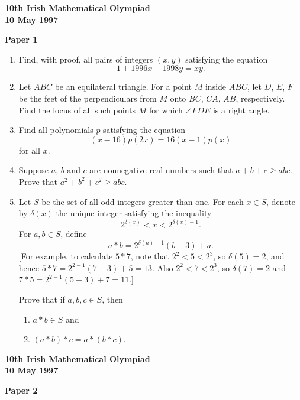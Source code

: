 \documentclass[12pt]{article}
\begin{document}
\begin{center}
{\large\bfseries 10th Irish Mathematical Olympiad\\10 May 1997}
\end{center}
\bigskip\noindent\textbf{Paper 1}\bigskip
\begin{enumerate}
\item Find, with proof, all pairs of integers $(x, y)$ satisfying the equation
\[
1 + 1996x + 1998y = xy.
\]

\item Let $ABC$ be an equilateral triangle.
For a point $M$ inside $ABC$, let $D$, $E$, $F$ be the feet of the perpendiculars from $M$ onto $BC$, $CA$, $AB$, respectively. Find the locus of all such points $M$ for which $\angle FDE$ is a right angle.

\item Find all polynomials $p$ satisfying the equation
\[
(x - 16)p(2x) = 16(x - 1)p(x)
\]
for all $x$.

\item Suppose $a$, $b$ and $c$ are nonnegative real numbers such that $a + b + c \geq abc$. Prove that $a^2 + b^2 + c^2 \geq abc$.

\item Let $S$ be the set of all odd integers greater than one. For each $x \in S$, denote by $\delta(x)$ the unique integer satisfying the inequality
\[
2^{\delta(x)} < x < 2^{\delta(x)+1}.
\]
For $a, b \in S$, define
\[
a * b = 2^{\delta(a)-1}(b - 3) + a.
\]
[For example, to calculate $5 * 7$, note that $2^2 < 5 < 2^3$, so $\delta(5) = 2$, and hence $5 * 7 = 2^{2-1}(7 - 3) + 5 = 13$. Also $2^2 < 7 < 2^3$, so $\delta(7) = 2$ and $7 * 5 = 2^{2-1}(5 - 3) + 7 = 11$.]

Prove that if $a, b, c \in S$, then
\begin{enumerate}
\item[(a)] $a * b \in S$ and
\item[(b)] $(a * b) * c = a * (b * c)$.
\end{enumerate}

\end{enumerate}
\newpage
\begin{center}
{\large\bfseries 10th Irish Mathematical Olympiad\\10 May 1997}
\end{center}
\bigskip\noindent\textbf{Paper 2}\bigskip
\end{document}
